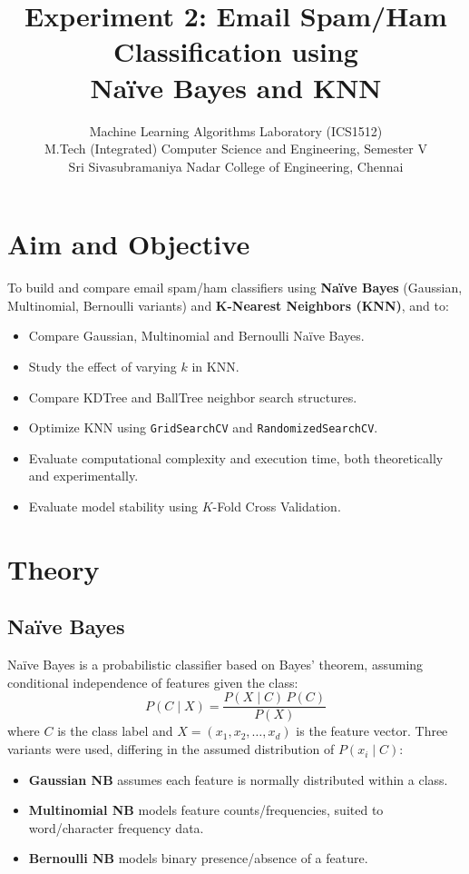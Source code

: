 \documentclass[11pt]{article}
\title{\textbf{Experiment 2: Email Spam/Ham Classification using \\ Na\"ive Bayes and KNN}}
\author{Machine Learning Algorithms Laboratory (ICS1512) \\
M.Tech (Integrated) Computer Science and Engineering, Semester V \\
Sri Sivasubramaniya Nadar College of Engineering, Chennai}
\date{}
\begin{document}
\maketitle

\section{Aim and Objective}
To build and compare email spam/ham classifiers using \textbf{Na\"ive Bayes} (Gaussian,
Multinomial, Bernoulli variants) and \textbf{K-Nearest Neighbors (KNN)}, and to:
\begin{itemize}
    \item Compare Gaussian, Multinomial and Bernoulli Na\"ive Bayes.
    \item Study the effect of varying $k$ in KNN.
    \item Compare KDTree and BallTree neighbor search structures.
    \item Optimize KNN using \texttt{GridSearchCV} and \texttt{RandomizedSearchCV}.
    \item Evaluate computational complexity and execution time, both theoretically and experimentally.
    \item Evaluate model stability using $K$-Fold Cross Validation.
\end{itemize}

\section{Theory}

\subsection{Na\"ive Bayes}
Na\"ive Bayes is a probabilistic classifier based on Bayes' theorem, assuming
conditional independence of features given the class:
\begin{equation}
P(C \mid X) = \frac{P(X \mid C)\,P(C)}{P(X)}
\end{equation}
where $C$ is the class label and $X = (x_1, x_2, \ldots, x_d)$ is the feature vector.
Three variants were used, differing in the assumed distribution of $P(x_i \mid C)$:
\begin{itemize}
    \item \textbf{Gaussian NB} assumes each feature is normally distributed within a class.
    \item \textbf{Multinomial NB} models feature counts/frequencies, suited to
    word/character frequency data.
    \item \textbf{Bernoulli NB} models binary presence/absence of a feature.
\end{itemize}
\end{document}
